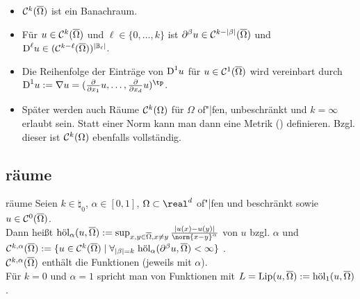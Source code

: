 \begin{Bem}
    \begin{itemize}
        \item
        $\C^k(\overline{\Omega})$ ist ein Banachraum.

        \item
        Für $u \in \C^k(\overline{\Omega})$ und $\ell \in \{0, \dotsc, k\}$ ist
        $\partial^\beta u \in \C^{k - |\beta|}(\overline{\Omega})$ und
        $\D^\ell u \in (\C^{k - \ell}(\overline{\Omega}))^{|\BB_\ell|}$.

        \item
        Die Reihenfolge der Einträge von $\D^1 u$ für $u \in \C^1(\overline{\Omega})$ wird
        vereinbart durch\\
        $\D^1 u := \nabla u =
        (\frac{\partial}{\partial x_1} u, \dotsc, \frac{\partial}{\partial x_d} u)^\tp$.

        \item
        Später werden auch Räume $\C^k(\Omega)$ für $\Omega$ of"|fen, unbeschränkt und
        $k = \infty$ erlaubt sein.
        Statt einer Norm kann man dann eine Metrik () definieren.
        Bzgl. dieser ist $\C^k(\Omega)$ ebenfalls vollständig.
    \end{itemize}
\end{Bem}

\subsection{%
    räume%
}

\begin{Def}{räume}
    Seien $k \in \natural_0$, $\alpha \in [0, 1]$, $\Omega \subset \real^d$ of"|fen
    und beschränkt sowie $u \in \C^0(\overline{\Omega})$.\\
    Dann heißt $\hol_\alpha(u, \overline{\Omega}) := \sup_{x, y \in \overline{\Omega}, x \not= y}
    \frac{|u(x) - u(y)|}{\norm{x - y}^\alpha}$  von $u$
    bzgl. $\alpha$ und\\
    $\C^{k,\alpha}(\overline{\Omega}) := \{u \in \C^k(\overline{\Omega}) \;|\;
    \forall_{|\beta| = k}\; \hol_\alpha(\partial^\beta u, \overline{\Omega}) < \infty\}$
    .\\
    $\C^{k,\alpha}(\overline{\Omega})$ enthält die  Funktionen
    (jeweils mit  $\alpha$).\\
    Für $k = 0$ und $\alpha = 1$ spricht man von  Funktionen
    mit 
    $L = \Lip(u, \overline{\Omega}) := \hol_1(u, \overline{\Omega})$.
\end{Def}

